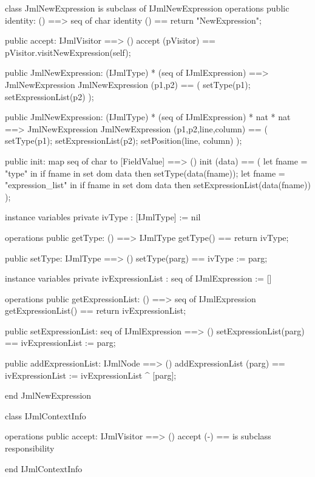 \begin{vdm_al}
class JmlNewExpression is subclass of IJmlNewExpression
operations
  public identity: () ==> seq of char
  identity () == return "NewExpression";

  public accept: IJmlVisitor ==> ()
  accept (pVisitor) == pVisitor.visitNewExpression(self);

  public JmlNewExpression:
    (IJmlType) *
    (seq of IJmlExpression) ==> JmlNewExpression
  JmlNewExpression (p1,p2) == 
    ( setType(p1);
      setExpressionList(p2) );

  public JmlNewExpression:
    (IJmlType) *
    (seq of IJmlExpression) *
    nat *
    nat ==> JmlNewExpression
  JmlNewExpression (p1,p2,line,column) == 
    ( setType(p1);
      setExpressionList(p2);
      setPosition(line, column) );

  public init: map seq of char to [FieldValue] ==> ()
  init (data) ==
    ( let fname = "type" in
        if fname in set dom data
        then setType(data(fname));
      let fname = "expression_list" in
        if fname in set dom data
        then setExpressionList(data(fname)) );

instance variables
  private ivType : [IJmlType] := nil

operations
  public getType: () ==> IJmlType
  getType() == return ivType;

  public setType: IJmlType ==> ()
  setType(parg) == ivType := parg;

instance variables
  private ivExpressionList : seq of IJmlExpression := []

operations
  public getExpressionList: () ==> seq of IJmlExpression
  getExpressionList() == return ivExpressionList;

  public setExpressionList: seq of IJmlExpression ==> ()
  setExpressionList(parg) == ivExpressionList := parg;

  public addExpressionList: IJmlNode ==> ()
  addExpressionList (parg) == ivExpressionList := ivExpressionList ^ [parg];

end JmlNewExpression
\end{vdm_al}

\begin{vdm_al}
class IJmlContextInfo

operations
  public accept: IJmlVisitor ==> ()
  accept (-) == is subclass responsibility

end IJmlContextInfo
\end{vdm_al}


